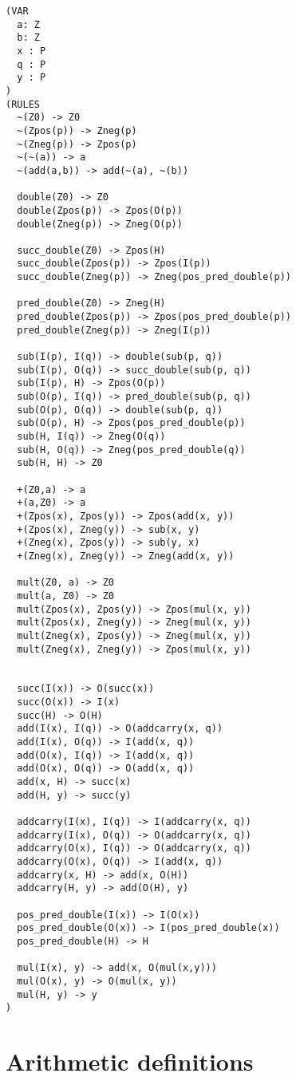 \begin{lstlisting}[language=trs, caption=Rewriting rule of $\bb{Z}$ and $\bb{P}$ in the TRS format]
(VAR
  a: Z
  b: Z
  x : P
  q : P
  y : P
)
(RULES
  ~(Z0) -> Z0
  ~(Zpos(p)) -> Zneg(p)
  ~(Zneg(p)) -> Zpos(p)
  ~(~(a)) -> a
  ~(add(a,b)) -> add(~(a), ~(b))

  double(Z0) -> Z0
  double(Zpos(p)) -> Zpos(O(p))
  double(Zneg(p)) -> Zneg(O(p))
  
  succ_double(Z0) -> Zpos(H)
  succ_double(Zpos(p)) -> Zpos(I(p))
  succ_double(Zneg(p)) -> Zneg(pos_pred_double(p))
  
  pred_double(Z0) -> Zneg(H)
  pred_double(Zpos(p)) -> Zpos(pos_pred_double(p))
  pred_double(Zneg(p)) -> Zneg(I(p))

  sub(I(p), I(q)) -> double(sub(p, q))
  sub(I(p), O(q)) -> succ_double(sub(p, q))
  sub(I(p), H) -> Zpos(O(p))
  sub(O(p), I(q)) -> pred_double(sub(p, q))
  sub(O(p), O(q)) -> double(sub(p, q))
  sub(O(p), H) -> Zpos(pos_pred_double(p))
  sub(H, I(q)) -> Zneg(O(q))
  sub(H, O(q)) -> Zneg(pos_pred_double(q))
  sub(H, H) -> Z0

  +(Z0,a) -> a
  +(a,Z0) -> a
  +(Zpos(x), Zpos(y)) -> Zpos(add(x, y))
  +(Zpos(x), Zneg(y)) -> sub(x, y)
  +(Zneg(x), Zpos(y)) -> sub(y, x)
  +(Zneg(x), Zneg(y)) -> Zneg(add(x, y))
  
  mult(Z0, a) -> Z0
  mult(a, Z0) -> Z0
  mult(Zpos(x), Zpos(y)) -> Zpos(mul(x, y))
  mult(Zpos(x), Zneg(y)) -> Zneg(mul(x, y))
  mult(Zneg(x), Zpos(y)) -> Zneg(mul(x, y))
  mult(Zneg(x), Zneg(y)) -> Zpos(mul(x, y))


  succ(I(x)) -> O(succ(x))
  succ(O(x)) -> I(x)
  succ(H) -> O(H)
  add(I(x), I(q)) -> O(addcarry(x, q))
  add(I(x), O(q)) -> I(add(x, q))
  add(O(x), I(q)) -> I(add(x, q))
  add(O(x), O(q)) -> O(add(x, q))
  add(x, H) -> succ(x)
  add(H, y) -> succ(y)

  addcarry(I(x), I(q)) -> I(addcarry(x, q))
  addcarry(I(x), O(q)) -> O(addcarry(x, q))
  addcarry(O(x), I(q)) -> O(addcarry(x, q))
  addcarry(O(x), O(q)) -> I(add(x, q))
  addcarry(x, H) -> add(x, O(H))
  addcarry(H, y) -> add(O(H), y)
  
  pos_pred_double(I(x)) -> I(O(x))
  pos_pred_double(O(x)) -> I(pos_pred_double(x))
  pos_pred_double(H) -> H
  
  mul(I(x), y) -> add(x, O(mul(x,y)))
  mul(O(x), y) -> O(mul(x, y))
  mul(H, y) -> y
)
\end{lstlisting}

\section{Arithmetic definitions}\label{app:arith-def}
\label{app:arith-defs}

